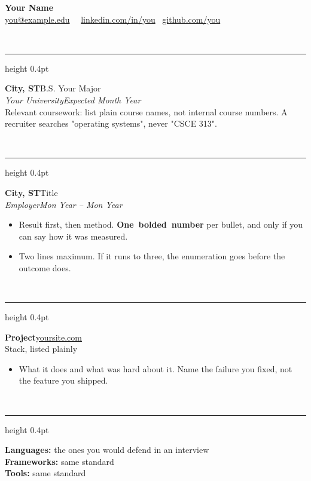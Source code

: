\documentclass[letterpaper,10pt]{article}
\newcommand{\smcp}[1]{{\headfont\bfseries #1}}
\newcommand{\smcp}[1]{\MakeUppercase{#1}}
\newcommand{\m}[1]{\textbf{\mbox{#1}}}
\newcommand{\link}[2]{\href{#1}{\color{linkcol}#2}}
\newcommand{\bigname}[1]{{\fontsize{23}{26}\selectfont\bfseries #1}}
\newcommand{\bigname}[1]{{\fontsize{23}{26}\selectfont\bfseries\textls[40]{#1}}}
\newcommand{\resheading}[1]{%
  \vspace{7pt}%
  {\bfseries\fontsize{10.5}{12}\selectfont\smcp{#1}}\\[3pt]%
  {\color{rulecol}\hrule height 0.4pt}%
  \vspace{4pt}%
}
\newcommand{\role}[4]{%
  \vspace{4pt}%
  {\bfseries #2}\hfill{#3}\\[1.5pt]%
  {\itshape #1}\hfill{\itshape\color{muted}#4}\\[1.5pt]%
}
\newcommand{\project}[4]{%
  \vspace{4pt}%
  {\bfseries #1}\hfill{\small\link{#4}{#3}}\\[1.5pt]%
  {\small #2}\\[1.5pt]%
}
\newcommand{\projectdual}[6]{%
  \vspace{4pt}%
  {\bfseries #1}\hfill{\small\link{#4}{#3}{\color{muted}\;\textbullet\;}\href{#6}{#5}}\\[1.5pt]%
  {\small #2}\\[1.5pt]%
}
\newcommand{\projectlinknote}[5]{%
  \vspace{4pt}%
  {\bfseries #1}\hfill{\small\link{#4}{#3}{\color{muted}\;\textbullet\;#5}}\\[1.5pt]%
  {\small #2}\\[1.5pt]%
}
\newcommand{\projectplain}[3]{%
  \vspace{4pt}%
  {\bfseries #1}\hfill{\small\color{muted}#3}\\[1.5pt]%
  {\small #2}\\[1.5pt]%
}
\newenvironment{bullets}
  {\begin{itemize}[leftmargin=12pt,topsep=1pt,itemsep=2.5pt,parsep=0pt,
                   partopsep=0pt,label={\textbullet}]}
  {\end{itemize}}
\begin{document}
%
%
%

\begin{center}
  {\bigname{Your Name}}\\[2pt]
  \small
  \href{mailto:you@example.edu}{you@example.edu} \textbullet\
  \phonefield \textbullet\
  \href{https://linkedin.com/in/you}{linkedin.com/in/you} \textbullet\
  \href{https://github.com/you}{github.com/you}
\end{center}

\resheading{Education}
\role{Your University}{City, ST}{B.S. Your Major}{Expected Month Year}
Relevant coursework: list plain course names, not internal course numbers. A
recruiter searches "operating systems", never "CSCE 313".

\resheading{Experience}
\role{Employer}{City, ST}{Title}{Mon Year -- Mon Year}
\begin{bullets}
  \item Result first, then method. \m{One bolded number} per bullet, and only if
        you can say how it was measured.
  \item Two lines maximum. If it runs to three, the enumeration goes before the
        outcome does.
\end{bullets}

\resheading{Projects}
\project{Project}{Stack, listed plainly}{yoursite.com}{https://yoursite.com}
\begin{bullets}
  \item What it does and what was hard about it. Name the failure you fixed, not
        the feature you shipped.
\end{bullets}

\resheading{Technical Skills}
\textbf{Languages:} the ones you would defend in an interview \\
\textbf{Frameworks:} same standard \\
\textbf{Tools:} same standard
\end{document}
